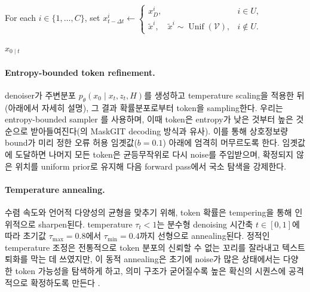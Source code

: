 \documentclass[11pt, a4paper, logo, copyright, gdm]{google}
\newcommand{\unif}{\operatorname{Unif}}
\newcommand{\Vcal}{\mathcal{V}}
\begin{document}
\begin{algorithm}[t!]
\begin{algorithmic}[1]
        \State For each $i\in\{1,\ldots,C\}$, set
        \Statex \hspace{\algorithmicindent}
            $\displaystyle
            x_{t-\Delta t}^i \gets
            \begin{cases}
                x_D^i,
                    & i\in U,\\
                \tilde{x}^i,\quad
                    \tilde{x}^i\sim\unif(\Vcal),
                    & i\notin U.
            \end{cases}$
    \EndIf
\EndFor

\State \Return $\hat{x}_{0\mid t}$
\end{algorithmic}
\end{algorithm}

\paragraph{Entropy-bounded token refinement.} denoiser가 주변분포 $p_{\theta}(x_0 \mid x_t, z_t, H)$를 생성하고 temperature scaling을 적용한 뒤(아래에서 자세히 설명), 그 결과 확률분포로부터 token을 sampling한다. 우리는 entropy-bounded sampler \citep{ben2026accelerated}를 사용하며, 이때 token은 entropy가 낮은 것부터 높은 것 순으로 받아들여진다(\citet{Changetal2022}의 MaskGIT decoding 방식과 유사). 이를 통해 상호정보량 bound가 미리 정한 오류 허용 임곗값($b=0.1$) 아래에 엄격히 머무르도록 한다. 임곗값에 도달하면 나머지 모든 token은 균등무작위로 다시 noise를 주입받으며, 확정되지 않은 위치를 uniform prior로 유지해 다음 forward pass에서 국소 탐색을 강제한다.

\paragraph{Temperature annealing.} 수렴 속도와 언어적 다양성의 균형을 맞추기 위해, token 확률은 tempering을 통해 인위적으로 sharpen된다. temperature $\tau_t < 1$는 분수형 denoising 시간축 $t \in [0, 1]$에 따라 초기값 $\tau_{\max}=0.8$에서 $\tau_{\min}=0.4$까지 선형으로 annealing된다. 정적인 temperature 조정은 전통적으로 token 분포의 신뢰할 수 없는 꼬리를 잘라내고 텍스트 퇴화를 막는 데 쓰였지만, 이 동적 annealing은 초기에 noise가 많은 상태에서는 다양한 token 가능성을 탐색하게 하고, 의미 구조가 굳어질수록 높은 확신의 시퀀스에 공격적으로 확정하도록 만든다 \citep{xiao2024edt}.
\end{document}
